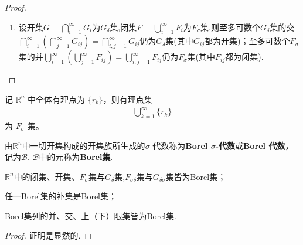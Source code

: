 \documentclass[../../main.tex]{subfiles}%
\begin{document}
\begin{proof}
\begin{enumerate}[(1)]
设$F$为闭集, 则$G = \mathbb{R}^n \setminus F$为开集, 由上知$G = \bigcup_{n=1}^\infty F_n$, $F_n(n \in \mathbb{N})$为闭集, 从而$F_n^c$为开集, 且有
\begin{align*}
F=G^c=\left( \bigcup_{n=1}^{\infty}{F_n} \right) ^c\xlongequal{\mathrm{De}\, \text{Morgan公式}}\bigcap_{n=1}^{\infty}{F_{n}^{c}},
\end{align*}
即闭集$F$为$G_\delta$集.

\item 设开集$G=\bigcap\limits_{i=1}^{\infty}G_i$为$G_{\delta}$集,闭集$F=\bigcup\limits_{i=1}^{\infty}F_i$为$F_{\sigma}$集,则至多可数个$G_{\delta}$集的交$\bigcap\limits_{i=1}^{\infty}\left(\bigcap\limits_{j=1}^{\infty}G_{ij}\right)=\bigcap\limits_{i,j=1}^{\infty}G_{ij}$仍为$G_{\delta}$集(其中$G_{ij}$都为开集)；至多可数个$F_{\sigma}$集的并$\bigcup\limits_{i=1}^{\infty}\left(\bigcup\limits_{j=1}^{\infty}F_{ij}\right)=\bigcup\limits_{i,j=1}^{\infty}F_{ij}$仍为$F_{\sigma}$集(其中$F_{ij}$都为闭集).
\end{enumerate}
\end{proof}

\begin{example}
记 $\mathbb{R}^n$ 中全体有理点为 $\{r_k\}$，则有理点集
\begin{align*}
\bigcup_{k = 1}^{\infty} \{r_k\}
\end{align*}
为 $F_{\sigma}$ 集。 
\end{example}

\begin{definition}[Borel集]\label{definition:Borel集}
由$\mathbb{R}^n$中一切开集构成的开集族所生成的$\sigma$-代数称为\textbf{Borel $\sigma$-代数}或\textbf{Borel 代数}，记为$\mathscr{B}$. $\mathscr{B}$中的元称为\textbf{Borel集}.
\end{definition}

\begin{proposition}[Borel集的基本性质]\label{proposition:Borel集的基本性质}
$\mathbb{R}^n$中的闭集、开集、$F_{\sigma}$集与$G_{\delta}$集,$F_{\sigma\delta}$集与$G_{\delta\sigma}$集皆为Borel集；

任一Borel集的补集是Borel集；

Borel集列的并、交、上（下）限集皆为Borel集. 
\end{proposition}
\begin{proof}
证明是显然的.
\end{proof}
\end{document}
